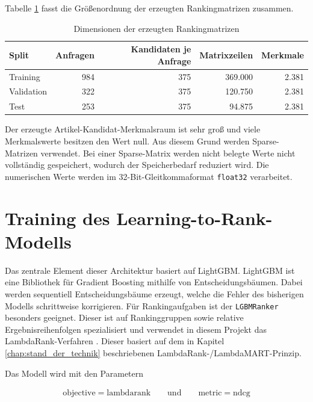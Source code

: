 Tabelle \ref{tab:matrixdimensionen} fasst die Größenordnung der erzeugten Rankingmatrizen zusammen.

\begin{table}[H]
    \centering
    \setlength{\tabcolsep}{5pt}
    \renewcommand{\arraystretch}{1.08}
    \caption{Dimensionen der erzeugten Rankingmatrizen}
    \label{tab:matrixdimensionen}
    \begin{tabular}{lrrrr}
        \toprule
        \textbf{Split} & \textbf{Anfragen} & \textbf{Kandidaten je Anfrage} & \textbf{Matrixzeilen} & \textbf{Merkmale} \\
        \midrule
        Training & 984 & 375 & 369.000 & 2.381 \\
        Validation & 322 & 375 & 120.750 & 2.381 \\
        Test & 253 & 375 & 94.875 & 2.381 \\
        \bottomrule
    \end{tabular}
\end{table}

Der erzeugte Artikel-Kandidat-Merkmalsraum ist sehr groß und viele Merkmalswerte besitzen den Wert null. Aus diesem Grund werden Sparse-Matrizen verwendet. Bei einer Sparse-Matrix werden nicht belegte Werte nicht vollständig gespeichert, wodurch der Speicherbedarf reduziert wird. Die numerischen Werte werden im 32-Bit-Gleitkommaformat \texttt{float32} verarbeitet. 

\section{Training des Learning-to-Rank-Modells}

Das zentrale Element dieser Architektur basiert auf LightGBM. LightGBM ist eine Bibliothek für Gradient Boosting mithilfe von Entscheidungsbäumen. Dabei werden sequentiell Entscheidungsbäume erzeugt, welche die Fehler des bisherigen Modells schrittweise korrigieren. Für Rankingaufgaben ist der \texttt{LGBMRanker} besonders geeignet. Dieser ist auf Rankinggruppen sowie relative Ergebnisreihenfolgen spezialisiert und verwendet in diesem Projekt das LambdaRank-Verfahren \parencite{LightGBM}.
Dieser basiert auf dem in Kapitel \ref{chap:stand_der_technik} beschriebenen LambdaRank-/LambdaMART-Prinzip.

Das Modell wird mit den Parametern 

\begin{align} 
    \text{objective} = \text{lambdarank} \qquad \text{und} \qquad \text{metric} = \text{ndcg}
\end{align} 

